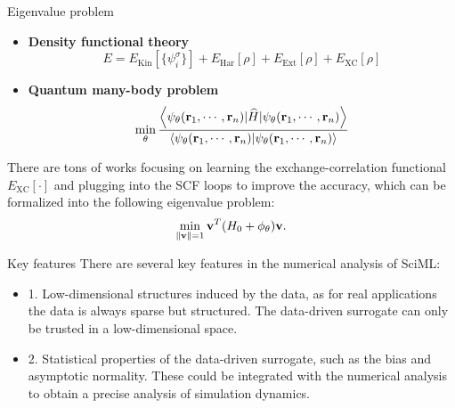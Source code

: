 \documentclass{beamer}
\begin{document}
\begin{frame}{Eigenvalue problem}
	\begin{itemize}
		\item \textbf{Density functional theory}
		\begin{equation*}
			E = E_{\mathrm{Kin}}[\{\psi_{i}^\sigma\}] + E_{\mathrm{Har}}[\rho] + E_{\mathrm{Ext}}[\rho] + E_{\mathrm{XC}}[\rho]
		\end{equation*}
		\item \textbf{Quantum many-body problem}
		\begin{equation*}
			\min_{\theta} \frac{\left\langle \psi_{\theta}(\mathbf{r}_1, \cdots, \mathbf{r}_n)|\widehat H| \psi_{\theta}(\mathbf{r}_1, \cdots, \mathbf{r}_n)\right\rangle}{\left\langle \psi_{\theta}(\mathbf{r}_1, \cdots, \mathbf{r}_n)| \psi_{\theta}(\mathbf{r}_1, \cdots, \mathbf{r}_n)\right\rangle}
		\end{equation*}
	\end{itemize}
	There are tons of works focusing on learning the exchange-correlation functional $E_{\mathrm{XC}}[\cdot]$ and plugging into the SCF loops to improve the accuracy, which
	can be formalized into the following eigenvalue problem:
	\begin{equation*}
		\min_{\left\| \mathbf{v} \right\| = 1} \mathbf{v}^T (H_0 + \phi_{\theta}) \mathbf{v}.
	\end{equation*}
\end{frame}

\begin{frame}{Key features}
	There are several key features in the numerical analysis of SciML:
	\begin{itemize}
		\item 1. Low-dimensional structures induced by the data, as for real applications the data is always sparse but structured. The data-driven surrogate can only be 
		trusted in a low-dimensional space.
		\item 2. Statistical properties of the data-driven surrogate, such as the bias and asymptotic normality. These could be integrated with the numerical analysis to 
		obtain a precise analysis of simulation dynamics.
	\end{itemize}
\end{frame}

\end{document}
